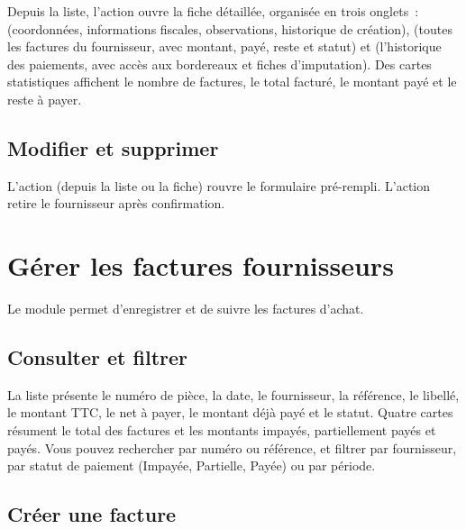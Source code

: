Depuis la liste, l'action  ouvre la fiche détaillée, organisée en trois onglets~:  (coordonnées, informations fiscales, observations, historique de création),  (toutes les factures du fournisseur, avec montant, payé, reste et statut) et  (l'historique des paiements, avec accès aux bordereaux et fiches d'imputation). Des cartes statistiques affichent le nombre de factures, le total facturé, le montant payé et le reste à payer.


\subsection{Modifier et supprimer}

L'action  (depuis la liste ou la fiche) rouvre le formulaire pré-rempli. L'action  retire le fournisseur après confirmation.

\section{Gérer les factures fournisseurs}

Le module  permet d'enregistrer et de suivre les factures d'achat.

\subsection{Consulter et filtrer}

La liste présente le numéro de pièce, la date, le fournisseur, la référence, le libellé, le montant TTC, le net à payer, le montant déjà payé et le statut. Quatre cartes résument le total des factures et les montants impayés, partiellement payés et payés. Vous pouvez rechercher par numéro ou référence, et filtrer par fournisseur, par statut de paiement (Impayée, Partielle, Payée) ou par période.


\subsection{Créer une facture}


